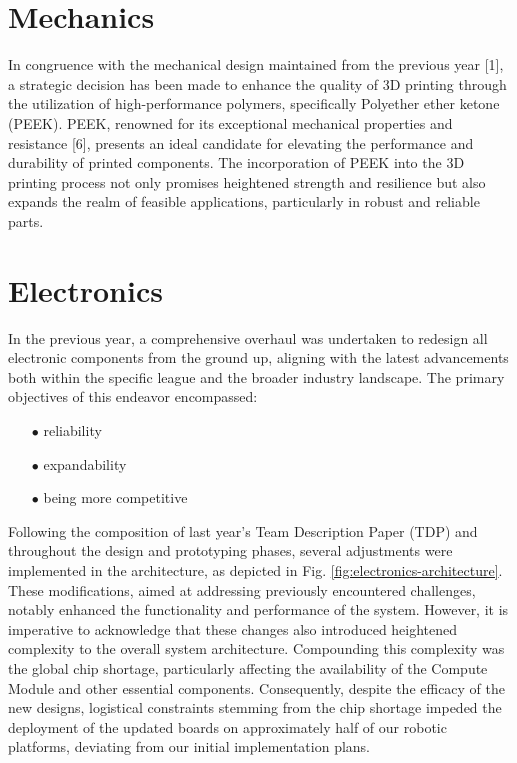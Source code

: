 \documentclass[runningheads]{llncs}
\begin{document}
\section {Mechanics}
In congruence with the mechanical design maintained from the previous year [1], a strategic decision has been made to enhance the quality of 3D printing through the utilization of high-performance polymers, specifically Polyether ether ketone (PEEK). PEEK, renowned for its exceptional mechanical properties and resistance [6], presents an ideal candidate for elevating the performance and durability of printed components. The incorporation of PEEK into the 3D printing process not only promises heightened strength and resilience but also expands the realm of feasible applications, particularly in robust and reliable parts.

\section{Electronics}

\indent 
In the previous year, a comprehensive overhaul was undertaken to redesign all electronic components from the ground up, aligning with the latest advancements both within the specific league and the broader industry landscape. The primary objectives of this endeavor encompassed:
\begin{enumerate}
    \item[$\bullet$] reliability
    \item[$\bullet$] expandability
    \item[$\bullet$] being more competitive
\end{enumerate}

Following the composition of last year's Team Description Paper (TDP) and throughout the design and prototyping phases, several adjustments were implemented in the architecture, as depicted in Fig. \ref{fig:electronics-architecture}. These modifications, aimed at addressing previously encountered challenges, notably enhanced the functionality and performance of the system. However, it is imperative to acknowledge that these changes also introduced heightened complexity to the overall system architecture. Compounding this complexity was the global chip shortage, particularly affecting the availability of the Compute Module and other essential components. Consequently, despite the efficacy of the new designs, logistical constraints stemming from the chip shortage impeded the deployment of the updated boards on approximately half of our robotic platforms, deviating from our initial implementation plans.
\end{document}
